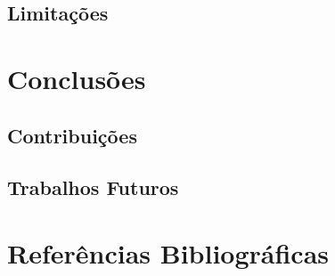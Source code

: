 \documentclass{beamer}
\begin{document}
\subsection[Limitações]{Limitações}

\section{Conclusões}

\subsection[Contribuições]{Contribuições}

\subsection[Trabalhos Futuros]{Trabalhos Futuros}

\section{Referências Bibliográficas}

\begin{frame}[allowframebreaks]





\end{frame}
\end{document}
